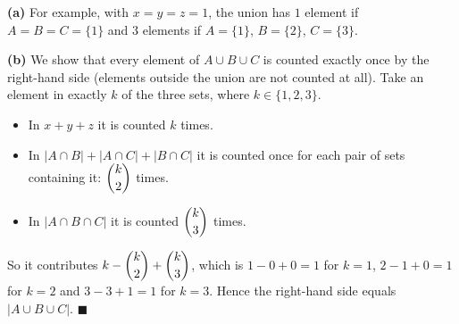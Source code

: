 \textbf{(a)} For example, with $x=y=z=1$, the union has $1$ element if $A=B=C=\{1\}$ and $3$ elements if $A=\{1\}$, $B=\{2\}$, $C=\{3\}$.

\textbf{(b)} We show that every element of $A\cup B\cup C$ is counted exactly once by the right-hand side (elements outside the union are not counted at all). Take an element in exactly $k$ of the three sets, where $k\in\{1,2,3\}$.
\begin{itemize}
\item In $x+y+z$ it is counted $k$ times.
\item In $|A\cap B|+|A\cap C|+|B\cap C|$ it is counted once for each pair of sets containing it: $\dbinom k2$ times.
\item In $|A\cap B\cap C|$ it is counted $\dbinom k3$ times.
\end{itemize}
So it contributes $k-\dbinom k2+\dbinom k3$, which is $1-0+0=1$ for $k=1$, $2-1+0=1$ for $k=2$ and $3-3+1=1$ for $k=3$. Hence the right-hand side equals $|A\cup B\cup C|$. $\blacksquare$
